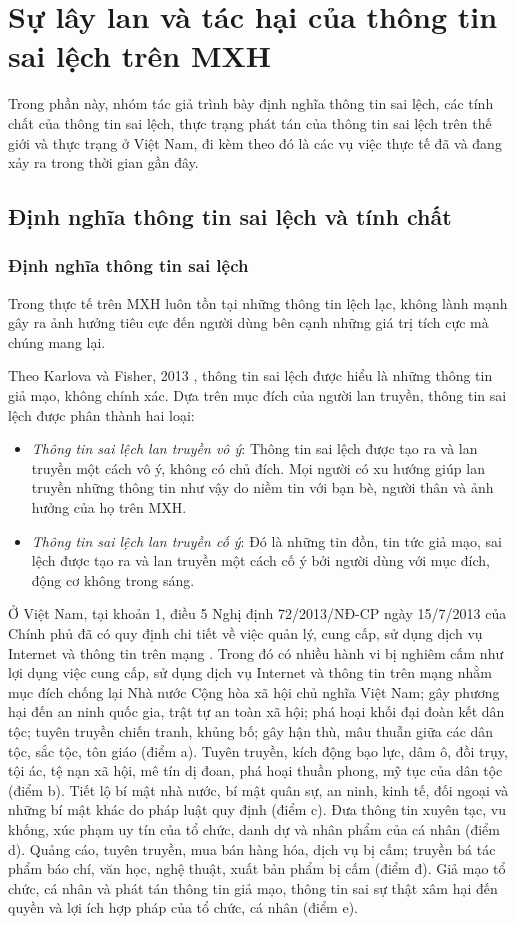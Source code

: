 \section{Sự lây lan và tác hại của thông tin sai lệch trên MXH}
Trong phần này, nhóm tác giả trình bày định nghĩa thông tin sai lệch, các tính chất của thông tin sai lệch, thực trạng phát tán của thông tin sai lệch trên thế giới và thực trạng ở Việt Nam, đi kèm theo đó là các vụ việc thực tế đã và đang xảy ra trong thời gian gần đây.
	\subsection{Định nghĩa thông tin sai lệch và tính chất}
		\subsubsection{Định nghĩa thông tin sai lệch}
		Trong thực tế trên MXH luôn tồn tại những thông tin lệch lạc, không lành mạnh gây ra ảnh hưởng tiêu cực đến người dùng bên cạnh những giá trị tích cực mà chúng mang lại.
		
		Theo Karlova và Fisher, 2013 \cite{karlova1}, thông tin sai lệch được hiểu là những thông tin giả mạo, không chính xác. Dựa trên mục đích của người lan truyền, thông tin sai lệch được phân thành hai loại:
		\begin {itemize}
		\item {\itshape Thông tin sai lệch lan truyền vô ý}: Thông tin sai lệch được tạo ra và lan truyền một cách vô ý, không có chủ đích. Mọi người có xu hướng giúp lan truyền những thông tin như vậy do niềm tin với bạn bè, người thân và ảnh hưởng của họ trên MXH.
		
		\item {\itshape Thông tin sai lệch lan truyền cố ý}: Đó là những tin đồn, tin tức giả mạo, sai lệch được tạo ra và lan truyền một cách cố ý bởi người dùng với mục đích, động cơ không trong sáng.
		\end {itemize}
		
		Ở Việt Nam, tại khoản 1, điều 5 Nghị định 72/2013/NĐ-CP ngày 15/7/2013 của Chính phủ đã có quy định chi tiết về việc quản lý, cung cấp, sử dụng dịch vụ Internet và thông tin trên mạng \cite{quidinh}. Trong đó có nhiều hành vi bị nghiêm cấm như lợi dụng việc cung cấp, sử dụng dịch vụ Internet và thông tin trên mạng nhằm mục đích chống lại Nhà nước Cộng hòa xã hội chủ nghĩa Việt Nam; gây phương hại đến an ninh quốc gia, trật tự an toàn xã hội; phá hoại khối đại đoàn kết dân tộc; tuyên truyền chiến tranh, khủng bố; gây hận thù, mâu thuẫn giữa các dân tộc, sắc tộc, tôn giáo (điểm a). Tuyên truyền, kích động bạo lực, dâm ô, đồi trụy, tội ác, tệ nạn xã hội, mê tín dị đoan, phá hoại thuần phong, mỹ tục của dân tộc (điểm b). Tiết lộ bí mật nhà nước, bí mật quân sự, an ninh, kinh tế, đối ngoại và những bí mật khác do pháp luật quy định (điểm c). Đưa thông tin xuyên tạc, vu khống, xúc phạm uy tín của tổ chức, danh dự và nhân phẩm của cá nhân (điểm d). Quảng cáo, tuyên truyền, mua bán hàng hóa, dịch vụ bị cấm; truyền bá tác phẩm báo chí, văn học, nghệ thuật, xuất bản phẩm bị cấm (điểm đ). Giả mạo tổ chức, cá nhân và phát tán thông tin giả mạo, thông tin sai sự thật xâm hại đến quyền và lợi ích hợp pháp của tổ chức, cá nhân (điểm e).

